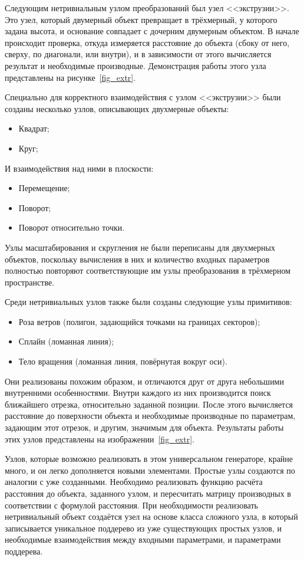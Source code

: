 \documentclass[a4paper,hidelinks,12pt]{article}
\begin{document}
\par
Следующим нетривиальным узлом преобразований был узел <<экструзии>>. Это узел, который двумерный объект превращает в трёхмерный, у которого задана высота, и основание совпадает с дочерним двумерным объектом. В начале происходит проверка, откуда измеряется расстояние до объекта (сбоку от него, сверху, по диагонали, или внутри), и в зависимости от этого вычисляется результат и необходимые производные. Демонстрация работы этого узла представлены на рисунке~\ref{fig_extr}.
\par
Специально для корректного взаимодействия с узлом <<экструзии>> были созданы несколько узлов, описывающих двухмерные объекты:
\begin{itemize}
    \item Квадрат;
    \item Круг;
\end{itemize}
И взаимодействия над ними в плоскости:
\begin{itemize}
    \item Перемещение;
    \item Поворот;
    \item Поворот относительно точки.
\end{itemize}
\par
Узлы масштабирования и скругления не были переписаны для двухмерных объектов, поскольку вычисления в них и количество входных параметров полностью повторяют соответствующие им узлы преобразования в трёхмерном пространстве.
\par
Среди нетривиальных узлов также были созданы следующие узлы примитивов:
\begin{itemize}
    \item Роза ветров (полигон, задающийся точками на границах секторов);
    \item Сплайн (ломанная линия);
    \item Тело вращения (ломанная линия, повёрнутая вокруг оси).
\end{itemize}
\par
Они реализованы похожим образом, и отличаются друг от друга небольшими внутренними особенностями. Внутри каждого из них производится поиск ближайшего отрезка, относительно заданной позиции. После этого вычисляется расстояние до поверхности объекта и необходимые производные по параметрам, задающим этот отрезок, и другим, значимым для объекта. Результаты работы этих узлов представлены на изображении~\ref{fig_extr}.
\par
Узлов, которые возможно реализовать в этом универсальном генераторе, крайне много, и он легко дополняется новыми элементами. Простые узлы создаются по аналогии с уже созданными. Необходимо реализовать функцию расчёта расстояния до объекта, заданного узлом, и пересчитать матрицу производных в соответствии с формулой расстояния. При необходимости реализовать нетривиальный объект создаётся узел на основе класса сложного узла, в который записывается уникальное поддерево из уже существующих простых узлов, и необходимые взаимодействия между входными параметрами, и параметрами поддерева.
\end{document}
